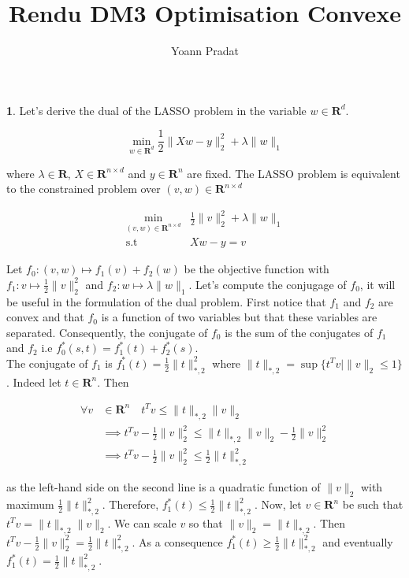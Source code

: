 \documentclass[a4paper, 11pt]{article}
\begin{document}
\title{Rendu DM3 Optimisation Convexe} 
\author{Yoann Pradat}
\maketitle

\textbf{1}. Let's derive the dual of the LASSO problem in the variable $w \in \mathbf{R}^d$. 

\begin{equation}
  \min_{w \in \mathbf{R}^d} \frac{1}{2} \| Xw-y \|_2^2 + \lambda \| w \|_1
\end{equation}

where $\lambda \in \mathbf{R}$, $X \in \mathbf{R}^{n\times d}$ and $y \in \mathbf{R}^n$ are fixed. The LASSO problem is
equivalent to the constrained problem over $(v,w) \in \mathbf{R}^{n\times d}$

\begin{align}
  \min_{(v,w) \in \mathbf{R}^{n\times d}} &\frac{1}{2} \| v \|_2^2 + \lambda \| w \|_1 \\
  \text{s.t} \quad &  Xw-y = v \nonumber
\end{align}

Let $f_0: (v,w) \mapsto f_1(v) + f_2(w)$ be the objective function with $f_1: v \mapsto \frac{1}{2} \|v\|_2^2$ and $f_2:
w \mapsto \lambda \|w\|_1$. Let's compute the conjugage of $f_0$, it will be useful in the formulation of the dual problem. First
notice that $f_1$ and $f_2$ are convex and that $f_0$ is a function of two variables but that these variables are
separated. Consequently, the conjugate of $f_0$ is the sum of the conjugates of $f_1$ and $f_2$ i.e $f_0^*(s,t) =
f_1^*(t) + f_2^*(s)$. \\

The conjugate of $f_1$ is $f_1^*(t)=\frac{1}{2} \| t\|_{*,2}^2$ where $ \| t\|_{*,2} = \sup\{t^Tv | \|v\|_2 \leq 1 \}$. Indeed
let $t \in \mathbf{R}^n$. Then 

\begin{align*}
  \forall v  &\in \mathbf{R}^n \quad  t^Tv \leq \|t\|_{*,2} \|v\|_{2} \\
  &\implies t^Tv - \frac{1}{2}\|v\|_2^2 \leq \|t\|_{*,2} \|v\|_{2} - \frac{1}{2}\|v\|_2^2  \\
  &\implies t^Tv - \frac{1}{2}\|v\|_2^2 \leq \frac{1}{2} \|t\|_{*,2}^2
\end{align*}

as the left-hand side on the second line is a quadratic function of $\|v\|_2$ with maximum $\frac{1}{2}\|t\|_{*,2}^2$.
Therefore, $f_1^*(t) \leq \frac{1}{2} \|t\|_{*,2}^2$. Now, let $v \in \mathbf{R}^n$ be such that $t^Tv  =  \| t\|_{*,2} 
\|v\|_2$. We can scale $v$ so that $\|v\|_2 = \| t\|_{*,2}$. Then  $t^Tv - \frac{1}{2}\|v\|_2^2 =
\frac{1}{2}\|t\|_{*,2}^2$. As a consequence $f_1^*(t) \geq \frac{1}{2} \|t\|_{*,2}^2$ and eventually $f_1^*(t) = 
\frac{1}{2} \|t\|_{*,2}^2$. \\
\end{document}
